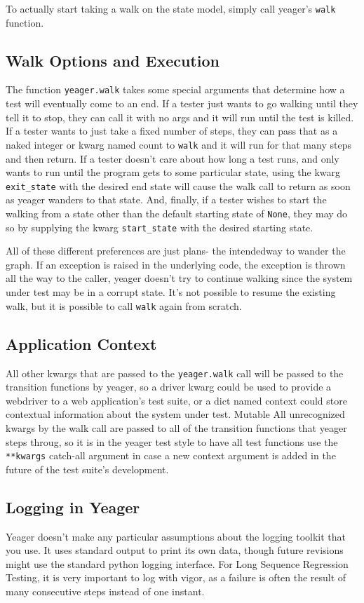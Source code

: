 To actually start taking a walk on the state model, simply call yeager's \texttt{walk} function.

\subsection{Walk Options and Execution}
The function \texttt{yeager.walk} takes some special arguments that determine how a test will eventually come to an end. If a tester just wants to go walking until they tell it to stop, they can call it with no args and it will run until the test is killed. If a tester wants to just take a fixed number of steps, they can pass that as a naked integer or kwarg named count to \texttt{walk} and it will run for that many steps and then return. If a tester doesn't care about how long a test runs, and only wants to run until the program gets to some particular state, using the kwarg \texttt{exit\_state} with the desired end state will cause the walk call to return as soon as yeager wanders to that state. And, finally, if a tester wishes to start the walking from a state other than the default starting state of \texttt{None}, they may do so by supplying the kwarg \texttt{start\_state} with the desired starting state.

All of these different preferences are just plans- the intendedway to wander the graph. If an exception is raised in the underlying code, the exception is thrown all the way to the caller, yeager doesn't try to continue walking since the system under test may be in a corrupt state. It's not possible to resume the existing walk, but it is possible to call \texttt{walk} again from scratch.

\subsection{Application Context}
All other kwargs that are passed to the \texttt{yeager.walk} call will be passed to the transition functions by yeager, so a driver kwarg could be used to provide a webdriver to a web application's test suite, or a dict named context could store contextual information about the system under test. Mutable All unrecognized kwargs by the walk call are passed to all of the transition functions that yeager steps throug, so it is in the yeager test style to have all test functions use the \texttt{**kwargs} catch-all argument in case a new context argument is added in the future of the test suite's development.

\subsection{Logging in Yeager}
Yeager doesn't make any particular assumptions about the logging toolkit that you use. It uses standard output to print its own data, though future revisions might use the standard python logging interface. For Long Sequence Regression Testing, it is very important to log with vigor, as a failure is often the result of many consecutive steps instead of one instant.

